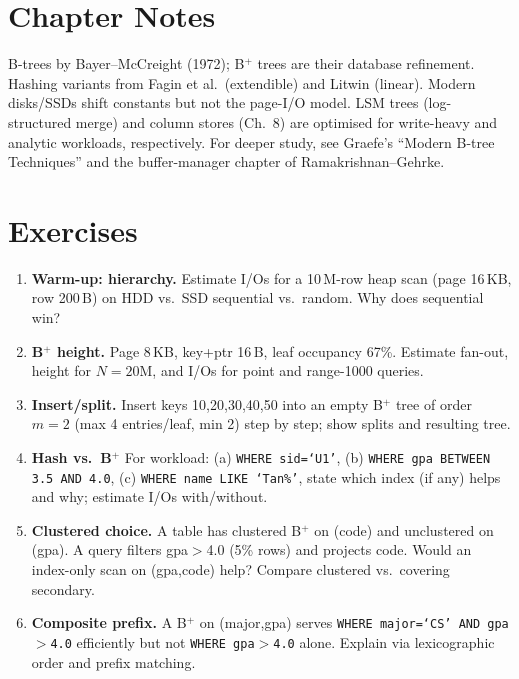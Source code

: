 \section{Chapter Notes}

B-trees by Bayer--McCreight (1972); B$^+$ trees are their database refinement. Hashing variants from Fagin et al.\ (extendible) and Litwin (linear). Modern disks/SSDs shift constants but not the page-I/O model. LSM trees (log-structured merge) and column stores (Ch.~8) are optimised for write-heavy and analytic workloads, respectively. For deeper study, see Graefe's ``Modern B-tree Techniques'' and the buffer-manager chapter of Ramakrishnan--Gehrke.

\section{Exercises}
\label{sec:ch05-ex}
\begin{enumerate}[label=E5.\arabic*, leftmargin=*, itemsep=0.75em]
    \item \textbf{Warm-up: hierarchy.} Estimate I/Os for a 10\,M-row heap scan (page 16\,KB, row 200\,B) on HDD vs.\ SSD sequential vs.\ random. Why does sequential win?
    \item \textbf{B$^+$ height.} Page 8\,KB, key+ptr 16\,B, leaf occupancy 67\%. Estimate fan-out, height for $N=20$M, and I/Os for point and range-1000 queries.
    \item \textbf{Insert/split.} Insert keys 10,20,30,40,50 into an empty B$^+$ tree of order $m=2$ (max 4 entries/leaf, min 2) step by step; show splits and resulting tree.
    \item \textbf{Hash vs.\ B$^+$} For workload: (a) \texttt{WHERE sid=`U1'}, (b) \texttt{WHERE gpa BETWEEN 3.5 AND 4.0}, (c) \texttt{WHERE name LIKE `Tan\%'}, state which index (if any) helps and why; estimate I/Os with/without.
    \item \textbf{Clustered choice.} A table has clustered B$^+$ on (code) and unclustered on (gpa). A query filters gpa$>$4.0 (5\% rows) and projects code. Would an index-only scan on (gpa,code) help? Compare clustered vs.\ covering secondary.
    \item \textbf{Composite prefix.} A B$^+$ on (major,gpa) serves \texttt{WHERE major=`CS' AND gpa$>$4.0} efficiently but not \texttt{WHERE gpa$>$4.0} alone. Explain via lexicographic order and prefix matching.
\end{enumerate}
